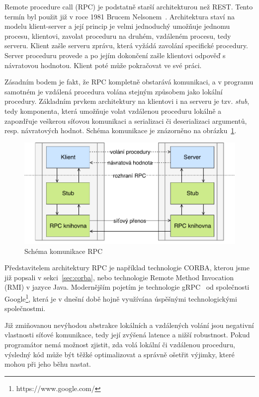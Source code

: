 Remote procedure call (\gls{RPC}) je podstatně starší architekturou než \gls{REST}.
Tento termín byl použit již v roce 1981 Brucem Nelsonem~\cite{nelson1981remote}.
Architektura staví na modelu klient-server a její princip je velmi jednoduchý \textendash
umožňuje jednomu procesu, klientovi, zavolat proceduru na druhém, vzdáleném procesu, tedy serveru.
Klient zašle serveru zprávu, která vyžádá zavolání specifické procedury. Server
proceduru provede a po jejím dokončení zašle klientovi odpověď s návratovou hodnotou.
Klient poté může pokračovat ve své práci.

Zásadním bodem je fakt, že \gls{RPC} kompletně obstarává komunikaci, a v programu samotném
je vzdálená procedura volána stejným způsobem jako lokální procedury. Základním
prvkem architektury na klientovi i na serveru je tzv. \textit{stub}, tedy komponenta, která
umožňuje volat vzdálenou proceduru lokálně a zapozdřuje veškerou síťovou komunikaci
a serializaci či deserializaci argumentů, resp. návratových hodnot. Schéma komunikace
je znázorněno na obrázku~\ref{fig:rpc}.

\begin{figure}[t]
    \centering
    \includegraphics[keepaspectratio=true, width=0.7\linewidth]{figures/rpc.pdf}
    \caption{Schéma komunikace \gls{RPC}}
    \label{fig:rpc}
\end{figure}

Představitelem architektury \gls{RPC} je například technologie \gls{CORBA},
kterou jsme již popsali v sekci~\ref{sec:corba}, nebo technologie Remote Method Invocation (\gls{RMI})
v jazyce Java. Modernějším pojetím je technologie gRPC~\cite{grpcio}
od společnosti Google\footnote{https://www.google.com/},
která je v dnešní době hojně využívána úspěšnými technologickými společnostmi.

Již zmiňovanou nevýhodou abstrakce lokálních a vzdálených volání jsou
negativní vlastnosti síťové komunikace, tedy její zvýšená latence
a nižší robustnost. Pokud programátor nemá možnost zjistit, zda volá
lokální či vzdálenou proceduru, výsledný kód může být těžké optimalizovat
a správně ošetřit výjimky, které mohou při jeho běhu nastat.

